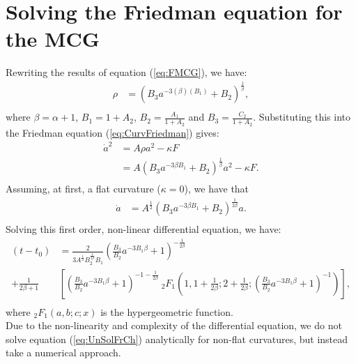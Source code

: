 \documentclass[a4paper, 11pt]{FSKH_623_Report}
\numberwithin{equation}{section}
\newcommand{\brac}[1]{\left(#1\right)}
\newcommand{\bracc}[1]{\left[#1\right]}
\begin{document}
\section{Solving the Friedman equation for the MCG}
Rewriting the results of equation (\ref{eq:FMCG}), we have:
\begin{equation}\label{eq:ReFMCG}
\begin{split}
\rho&=\brac{B_{3}a^{-3\brac{\beta}\brac{B_{1}}}+B_{2}}^{\frac{1}{\beta}},\\
\end{split}
\end{equation}
where $\beta=\alpha+1$, $B_{1}=1+A_{2}$, $B_{2}=\frac{A_{1}}{1+A_{2}}$ and $B_{3}=\frac{C_{2}}{1+A_{2}}$. Substituting this into the Friedman equation (\ref{eq:CurvFriedman}) gives:
\begin{equation}\label{eq:UnSolFrCh}
\begin{split}
\dot{a}^{2} &= A\rho a^{2}-\kappa F\\
&= A\brac{B_{3}a^{-3\beta B_{1}}+B_{2}}^{\frac{1}{\beta}} a^{2}-\kappa F.\\
\end{split}
\end{equation}
Assuming, at first, a flat curvature ($\kappa=0$), we have that
\begin{equation}\label{eq:MCGFFC}
\begin{split}
\dot{a}&= A^{\frac{1}{2}}\brac{B_{3}a^{-3\beta B_{1}}+B_{2}}^{\frac{1}{2\beta}} a.\\
\end{split}
\end{equation}
Solving this first order, non-linear differential equation, we have:
\begin{equation}\label{eq:FmEqMCGSol}
\begin{split}
\brac{t-t_{0}}&=\frac{2}{3A^{\frac{1}{2}}B_{2}^{\frac{1}{2\beta}}B_{1}}\brac{\frac{B_{3}}{B_{2}}a^{-3B_{1}\beta}+1}^{-\frac{1}{2\beta}}\\
+\frac{1}{2\beta+1}&\bracc{\brac{\frac{B_{3}}{B_{2}}a^{-3B_{1}\beta}+1}^{-1-\frac{1}{2\beta}}\ _{2}F_{1}\brac{1,1+\frac{1}{2\beta};2+\frac{1}{2\beta};\brac{\frac{B_{3}}{B_{2}}a^{-3B_{1}\beta}+1}^{-1}}},\\
\end{split}
\end{equation}
where $_{2}F_{1}\brac{a,b;c;x}$ is the hypergeometric function. \\
Due to the non-linearity and complexity of the differential equation, we do not solve equation (\ref{eq:UnSolFrCh}) analytically for non-flat curvatures, but instead take a numerical approach.
\end{document}
